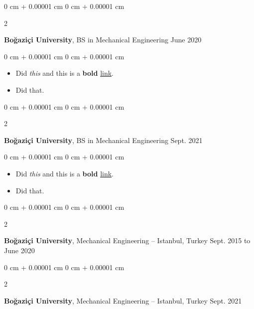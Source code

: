 \documentclass[10pt, letterpaper]{article}
\newenvironment{highlights}{
    \begin{itemize}[
        topsep=0.10 cm,
        parsep=0.10 cm,
        partopsep=0pt,
        itemsep=0pt,
        leftmargin=0 cm + 10pt
    ]
}{
    \end{itemize}
} %
\newenvironment{onecolentry}{
    \begin{adjustwidth}{
        0 cm + 0.00001 cm
    }{
        0 cm + 0.00001 cm
    }
}{
    \end{adjustwidth}
} %
\newenvironment{twocolentry}[2][]{
    \onecolentry
    \def\secondColumn{#2}
    \setcolumnwidth{\fill, 4.5 cm}
    \begin{paracol}{2}
}{
    \switchcolumn \raggedleft \secondColumn
    \end{paracol}
    \endonecolentry
} %
\begin{document}
        \vspace{0.2 cm}

        \begin{twocolentry}{
            June 2020
        }
            \textbf{Boğaziçi University}, BS in Mechanical Engineering\end{twocolentry}

        \vspace{0.10 cm}
        \begin{onecolentry}
            \begin{highlights}
                \item Did \textit{this} and this is a \textbf{bold} \href{https://example.com}{link}.
                \item Did that.
            \end{highlights}
        \end{onecolentry}


        \vspace{0.2 cm}

        \begin{twocolentry}{
            Sept. 2021
        }
            \textbf{Boğaziçi University}, BS in Mechanical Engineering\end{twocolentry}

        \vspace{0.10 cm}
        \begin{onecolentry}
            \begin{highlights}
                \item Did \textit{this} and this is a \textbf{bold} \href{https://example.com}{link}.
                \item Did that.
            \end{highlights}
        \end{onecolentry}


        \vspace{0.2 cm}

        \begin{twocolentry}{
            Sept. 2015 to June 2020
        }
            \textbf{Boğaziçi University}, Mechanical Engineering -- Istanbul, Turkey\end{twocolentry}



        \vspace{0.2 cm}

        \begin{twocolentry}{
            Sept. 2021
        }
            \textbf{Boğaziçi University}, Mechanical Engineering -- Istanbul, Turkey\end{twocolentry}
\end{document}
